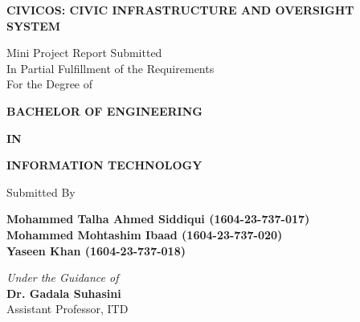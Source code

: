 \documentclass[12pt,a4paper]{report}
\begin{document}
\pagestyle{empty}

\begin{titlepage}
\thispagestyle{empty}
\centering

\vspace*{0.5cm}

{\bfseries\fontsize{16}{19}\selectfont CIVICOS: CIVIC INFRASTRUCTURE AND OVERSIGHT SYSTEM}

\vspace{0.6cm}

{\fontsize{12}{15}\selectfont
Mini Project Report Submitted\\
In Partial Fulfillment of the Requirements\\
For the Degree of}

\vspace{0.5cm}

{\bfseries\fontsize{14}{17}\selectfont BACHELOR OF ENGINEERING}

\vspace{0.2cm}

{\bfseries\fontsize{14}{17}\selectfont IN}

\vspace{0.2cm}

{\bfseries\fontsize{14}{17}\selectfont INFORMATION TECHNOLOGY}

\vspace{0.5cm}

{\fontsize{12}{15}\selectfont Submitted By}

\vspace{0.4cm}

{\bfseries\fontsize{12}{15}\selectfont
Mohammed Talha Ahmed Siddiqui \quad (1604-23-737-017)\\
Mohammed Mohtashim Ibaad \quad\quad\enspace (1604-23-737-020)\\
Yaseen Khan \quad\quad\quad\enspace (1604-23-737-018)}

\vspace{0.4cm}

{\itshape\fontsize{12}{15}\selectfont Under the Guidance of}\\[0.2cm]
{\bfseries\fontsize{12}{15}\selectfont Dr. Gadala Suhasini}\\[0.1cm]
{\fontsize{12}{15}\selectfont Assistant Professor, ITD}

\vspace{0.4cm}


\end{titlepage}
\end{document}
